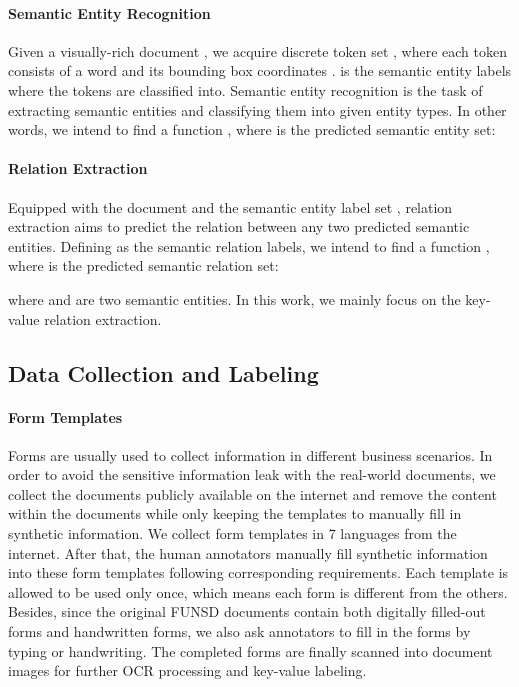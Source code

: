 \documentclass[11pt]{article}
\begin{document}
\paragraph{Semantic Entity Recognition}
Given a visually-rich document , we acquire discrete token set , where each token  consists of a word  and its bounding box coordinates .  is the semantic entity labels where the tokens are classified into.
Semantic entity recognition is the task of extracting semantic entities and classifying them into given entity types. In other words, we intend to find a function , where  is the predicted semantic entity set:


\paragraph{Relation Extraction}
Equipped with the document  and the semantic entity label set , relation extraction aims to predict the relation between any two predicted semantic entities. Defining  as the semantic relation labels, we intend to find a function , where  is the predicted semantic relation set:

where  and  are two semantic entities. In this work, we mainly focus on the key-value relation extraction.


\subsection{Data Collection and Labeling}

\paragraph{Form Templates}
Forms are usually used to collect information in different business scenarios. In order to avoid the sensitive information leak with the real-world documents, we collect the documents publicly available on the internet and remove the content within the documents while only keeping the templates to manually fill in synthetic information. We collect form templates in 7 languages from the internet. After that, the human annotators manually fill synthetic information into these form templates following corresponding requirements. Each template is allowed to be used only once, which means each form is different from the others. Besides, since the original FUNSD documents contain both digitally filled-out forms and handwritten forms, we also ask annotators to fill in the forms by typing or handwriting. The completed forms are finally scanned into document images for further OCR processing and key-value labeling.
\end{document}
